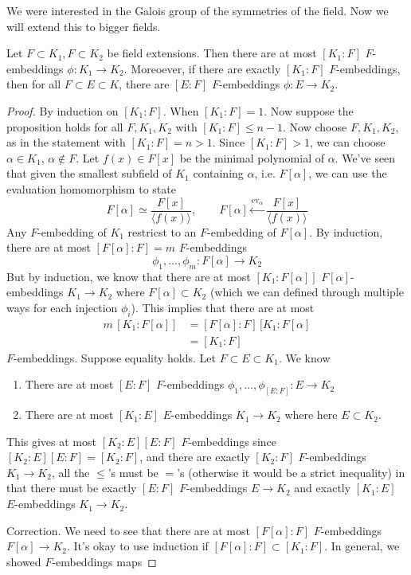   We were interested in the Galois group of the symmetries of the field. Now we will extend this to bigger fields. 

  \begin{theorem}
    Let $F \subset K_1, F \subset K_2$ be field extensions. Then there are at most $[K_1:F]$ $F$-embeddings $\phi: K_1 \to K_2$. Moreoever, if there are exactly $[K_1:F]$ $F$-embeddings, then for all $F \subset E \subset K$, there are $[E:F]$ $F$-embeddings $\phi: E \to K_2$. 
  \end{theorem}
  \begin{proof}
    By induction on $[K_1:F]$. When $[K_1:F] = 1$. Now suppose the proposition holds for all $F, K_1, K_2$ with $[K_1:F] \leq n-1$. Now choose $F, K_1, K_2$, as in the statement with $[K_1 : F] = n > 1$. Since $[K_1: F] > 1$, we can choose $\alpha \in K_1$, $\alpha \not\in F$. Let $f(x) \in F[x]$ be the minimal polynomial of $\alpha$. We've seen that given the smallest subfield of $K_1$ containing $\alpha$, i.e. $F[\alpha]$, we can use the evaluation homomorphism to state 
    \begin{equation}
      F[\alpha] \simeq \frac{F[x]}{\langle f(x)\rangle}, \qquad F[\alpha] \xleftarrow{\mathrm{ev}_\alpha} \frac{F[x]}{\langle f(x)\rangle} 
    \end{equation}
    Any $F$-embedding of $K_1$ restricst to an $F$-embedding of $F[\alpha]$. By induction, there are at most $[F[\alpha]: F] = m$ $F$-embeddings 
    \begin{equation}
      \phi_1, \ldots, \phi_m : F[\alpha] \to K_2
    \end{equation}
    But by induction, we know that there are at most $[K_1: F[\alpha]]$ $F[\alpha]$-embeddings $K_1 \to K_2$ where $F[\alpha] \subset K_2$ (which we can defined through multiple ways for each injection $\phi_i$). This implies that there are at most 
    \begin{align}
      m \, [K_1: F[\alpha]] & = [F[\alpha]: F]\, [K_1: F[\alpha] \\
                            & = [K_1 : F]
    \end{align}
    $F$-embeddings. Suppose equality holds. Let $F \subset E \subset K_1$. We know 
    \begin{enumerate}
      \item There are at most $[E:F]$ $F$-embeddings $\phi_1, \ldots, \phi_{[E:F]}: E \to K_2$ 
      \item There are at most $[K_1:E]$ $E$-embeddings $K_1 \to K_2$ where here $E \subset K_2$. 
    \end{enumerate}
    This gives at most $[K_2:E] [E:F]$ $F$-embeddings since $[K_2 :E] [E:F] = [K_2 :F]$, and there are exactly $[K_2 : F]$ $F$-embeddings $K_1 \to K_2$, all the $\leq$'s must be $=$'s (otherwise it would be a strict inequality) in that there must be exactly $[E:F]$ $F$-embeddings $E \to K_2$ and exactly $[K_1: E]$ $E$-embeddings $K_1 \to K_2$. 

    Correction. We need to see that there are at most $[F[\alpha]:F]$ $F$-embeddings $F[\alpha] \to K_2$. It's okay to use induction if $[F[\alpha]: F] \subset [K_1:F]$. In general, we showed $F$-embeddings maps 
  \end{proof}


